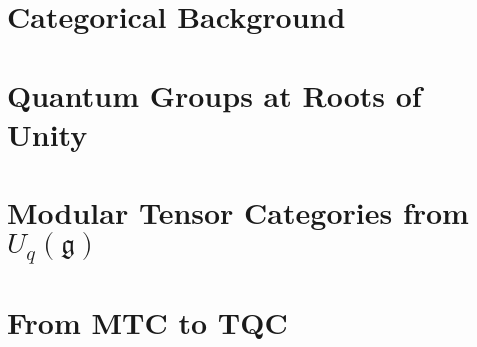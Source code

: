 \mediumspacing

\chapter{Categorical Background} 
\label{chap:categoricalbackground} 
\singlespacing


\mediumspacing

\chapter{Quantum Groups at Roots of Unity} 
\label{chap:uqsl2} 
\singlespacing


\mediumspacing


\chapter{Modular Tensor Categories from $U_q(\mathfrak{g})$} 
\label{chap:MTCfromuqsl2} 
\singlespacing


\mediumspacing

\chapter{From MTC to TQC} 
\label{chap:MTCtoTQC} 
\singlespacing


\mediumspacing


\clearpage
{}




%



